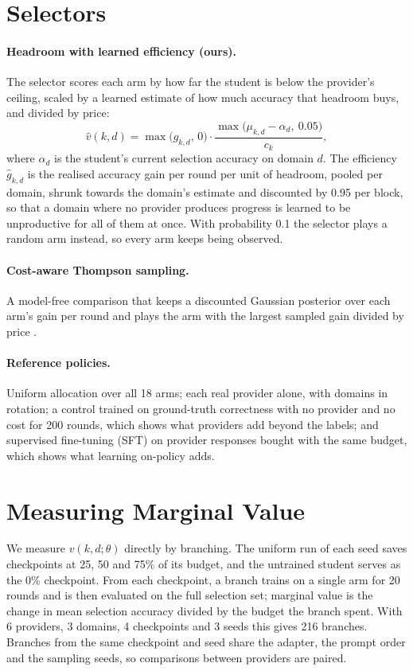 \section{Selectors}
\label{ca:sec:selectors}

\paragraph{Headroom with learned efficiency (ours).} The selector scores each arm by how
far the student is below the provider's ceiling, scaled by a learned estimate of how much
accuracy that headroom buys, and divided by price:
\[
  \hat{v}(k, d) = \max\big(\hat{g}_{k,d},\, 0\big) \cdot
                  \frac{\max\big(\mu_{k,d} - \alpha_d,\ 0.05\big)}{c_k},
\]
where $\alpha_d$ is the student's current selection accuracy on domain $d$. The efficiency
$\hat{g}_{k,d}$ is the realised accuracy gain per round per unit of headroom, pooled per
domain, shrunk towards the domain's estimate and discounted by 0.95 per block, so that a
domain where no provider produces progress is learned to be unproductive for all of them at
once. With probability 0.1 the selector plays a random arm instead, so every arm keeps
being observed.

\paragraph{Cost-aware Thompson sampling.} A model-free comparison that keeps a discounted
Gaussian posterior over each arm's gain per round and plays the arm with the largest
sampled gain divided by price \autocite{xia_budgeted_ts_2015,raj_dts_2017}.

\paragraph{Reference policies.} Uniform allocation over all 18 arms; each real provider
alone, with domains in rotation; a control trained on ground-truth correctness with no
provider and no cost for 200 rounds, which shows what providers add beyond the labels; and
supervised fine-tuning (SFT) on provider responses bought with the same budget, which shows
what learning on-policy adds.

\section{Measuring Marginal Value}
\label{ca:sec:branching}

We measure $v(k, d; \theta)$ directly by branching. The uniform run of each seed saves
checkpoints at 25, 50 and 75\% of its budget, and the untrained student serves as the 0\%
checkpoint. From each checkpoint, a branch trains on a single arm for 20 rounds and is then
evaluated on the full selection set; marginal value is the change in mean selection
accuracy divided by the budget the branch spent. With 6 providers, 3 domains, 4 checkpoints
and 3 seeds this gives 216 branches. Branches from the same checkpoint and seed share the
adapter, the prompt order and the sampling seeds, so comparisons between providers are
paired.

